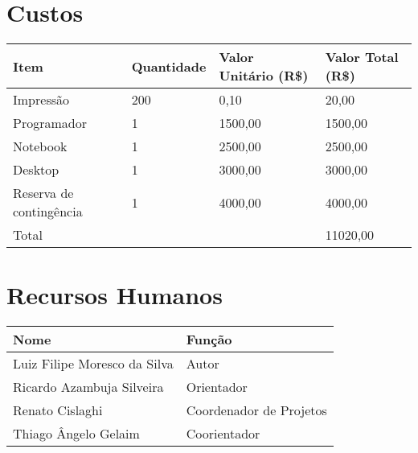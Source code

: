 \documentclass[12pt]{article}
\begin{document}
\section{Custos}
    \begin{tabular}{l l l l}
        \hline
        Item                    &   Quantidade  &   Valor Unitário (R\$)    &   Valor Total (R\$) \\
        \hline
        Impressão               &   200         &   0,10                    &   20,00             \\

        Programador             &   1           &   1500,00                 &   1500,00           \\
        Notebook                &   1           &   2500,00                 &   2500,00           \\
        Desktop                 &   1           &   3000,00                 &   3000,00           \\
        Reserva de contingência &   1           &   4000,00                 &   4000,00           \\
        \hline
        Total                   &               &                           &   11020,00
    \end{tabular}

\newpage
\section{Recursos Humanos}
    \begin{tabular}{l l}
        \hline
        Nome                            & Função                  \\
        \hline
        Luiz Filipe Moresco da Silva    & Autor                   \\
        Ricardo Azambuja Silveira       & Orientador              \\
        Renato Cislaghi                 & Coordenador de Projetos \\
        Thiago Ângelo Gelaim            & Coorientador            \\
        \hline
    \end{tabular}
    \\

\newpage
\end{document}
